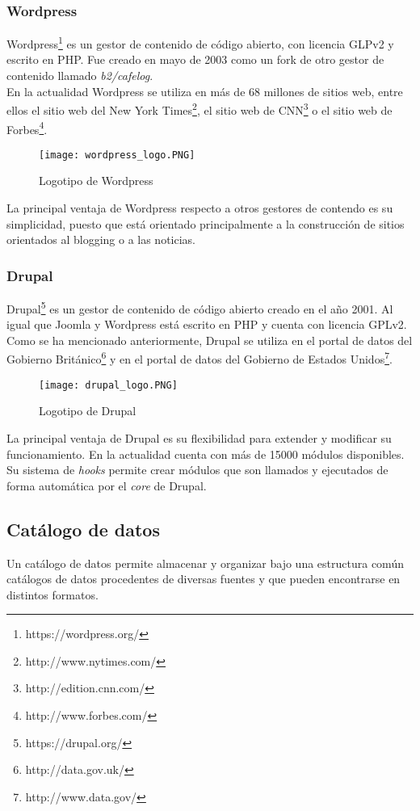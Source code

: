\subsubsection{Wordpress}
Wordpress\footnote{https://wordpress.org/} es un gestor de contenido de código abierto, con licencia GLPv2 y escrito en PHP.  Fue creado en mayo de 2003 como un fork de otro gestor de contenido llamado \textit{b2/cafelog}.\\
En la actualidad Wordpress se utiliza en más de 68 millones de sitios web, entre ellos el sitio web del New York Times\footnote{http://www.nytimes.com/}, el sitio web de CNN\footnote{http://edition.cnn.com/} o el sitio web de Forbes\footnote{http://www.forbes.com/}.

\begin{figure}[h]
\centering
\texttt{[image: wordpress\_logo.PNG]}
\caption{Logotipo de Wordpress}
\end{figure}

La principal ventaja de Wordpress respecto a otros gestores de contendo es su simplicidad, puesto que está orientado principalmente a la construcción de sitios orientados al blogging o a las noticias.


\subsubsection{Drupal}
Drupal\footnote{https://drupal.org/} es un gestor de contenido de código abierto creado en el año 2001.  Al igual que Joomla y Wordpress está escrito en PHP y cuenta con licencia GPLv2.\\
Como se ha mencionado anteriormente, Drupal se utiliza en el portal de datos del Gobierno Británico\footnote{http://data.gov.uk/} y en el portal de datos del Gobierno de Estados Unidos\footnote{http://www.data.gov/}.

\begin{figure}[h]
\centering
\texttt{[image: drupal\_logo.PNG]}
\caption{Logotipo de Drupal}
\end{figure}

La principal ventaja de Drupal es su flexibilidad para extender y modificar su funcionamiento.  En la actualidad cuenta con más de 15000 módulos disponibles.  Su sistema de \textit{hooks} permite crear módulos que son llamados y ejecutados de forma automática por el \textit{core} de Drupal.





\subsection{Catálogo de datos}
Un catálogo de datos permite almacenar y organizar bajo una estructura común catálogos de datos procedentes de diversas fuentes y que pueden encontrarse en distintos formatos.


